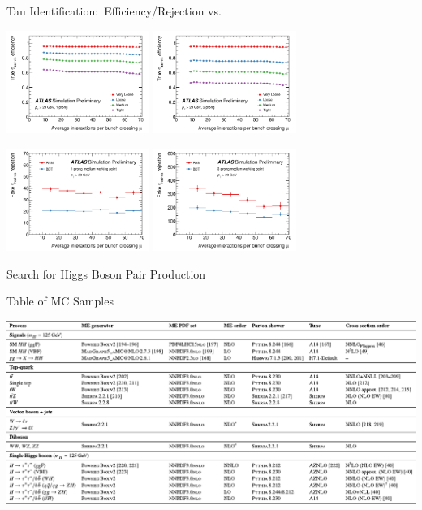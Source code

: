 \documentclass[11pt, xcolor={dvipsnames}, aspectratio=169]{beamer}
\begin{document}
\begin{frame}{Tau Identification:\ Efficiency/Rejection vs.\ \allbold{$\mu$}}
  \centering

  \includegraphics[width=0.35\textwidth]{tauid/pubnote/eff_vs_mu_1p}%
  \includegraphics[width=0.35\textwidth]{tauid/pubnote/eff_vs_mu_3p}%

  \includegraphics[width=0.35\textwidth]{tauid/pubnote/rej_vs_mu_1p}%
  \includegraphics[width=0.35\textwidth]{tauid/pubnote/rej_vs_mu_3p}%
\end{frame}


\begin{frame}[standout]
  Search for Higgs Boson Pair Production
\end{frame}


\begin{frame}{Table of MC Samples}
  \centering

  \includegraphics[width=1.\textwidth]{backup/mc_table}
\end{frame}
\end{document}
